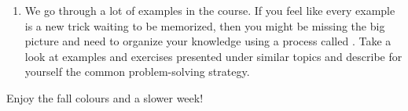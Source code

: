 \documentclass[../main.tex]{subfiles}
\begin{document}
\begin{enumerate}
  \item {} We go through a lot of examples in the course. If you feel like every example is a new trick waiting to be memorized, then you might be missing the big picture and need to organize your knowledge using a process called . Take a look at examples and exercises presented under similar topics and describe for yourself the common problem-solving strategy.
\end{enumerate}


\bigskip
Enjoy the fall colours and a slower week! 

  
\end{document}
